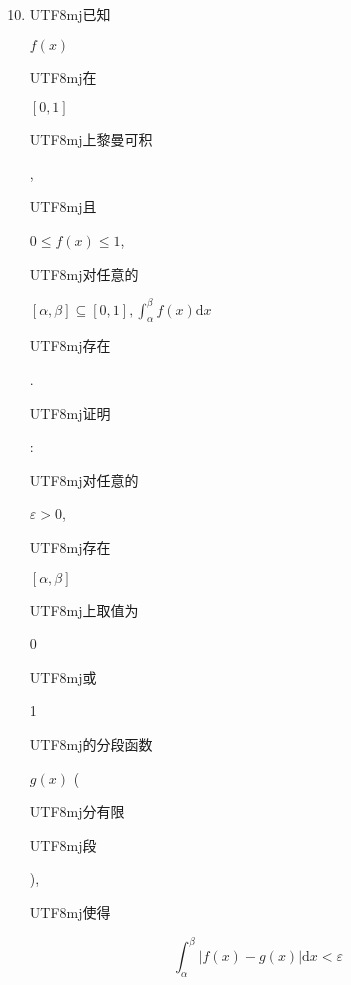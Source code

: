 \documentclass[10pt]{article}
\begin{document}
\begin{enumerate}
  \setcounter{enumi}{9}
  \item \begin{CJK}{UTF8}{mj}已知\end{CJK} $f(x)$ \begin{CJK}{UTF8}{mj}在\end{CJK} $[0,1]$ \begin{CJK}{UTF8}{mj}上黎曼可积\end{CJK}, \begin{CJK}{UTF8}{mj}且\end{CJK} $0 \leq f(x) \leq 1$, \begin{CJK}{UTF8}{mj}对任意的\end{CJK} $[\alpha, \beta] \subseteq[0,1], \int_{\alpha}^{\beta} f(x) \mathrm{d} x$ \begin{CJK}{UTF8}{mj}存在\end{CJK}. \begin{CJK}{UTF8}{mj}证明\end{CJK}: \begin{CJK}{UTF8}{mj}对任意的\end{CJK} $\varepsilon>0$, \begin{CJK}{UTF8}{mj}存在\end{CJK} $[\alpha, \beta]$ \begin{CJK}{UTF8}{mj}上取值为\end{CJK} 0 \begin{CJK}{UTF8}{mj}或\end{CJK} 1 \begin{CJK}{UTF8}{mj}的分段函数\end{CJK} $g(x)$ (\begin{CJK}{UTF8}{mj}分有限\end{CJK} \begin{CJK}{UTF8}{mj}段\end{CJK}), \begin{CJK}{UTF8}{mj}使得\end{CJK}
\end{enumerate}
$$
\int_{\alpha}^{\beta}|f(x)-g(x)| \mathrm{d} x<\varepsilon
$$
\end{document}
